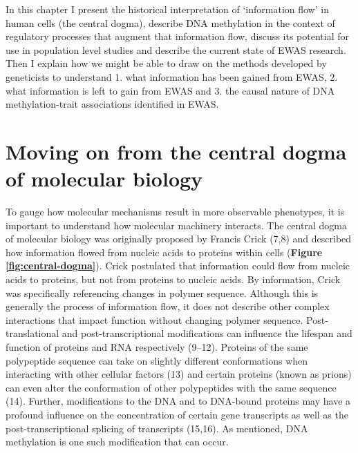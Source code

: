 \documentclass[11pt,oneside]{bristolthesis}
\begin{document}
In this chapter I present the historical interpretation of `information flow' in human cells (the central dogma), describe DNA methylation in the context of regulatory processes that augment that information flow, discuss its potential for use in population level studies and describe the current state of EWAS research. Then I explain how we might be able to draw on the methods developed by geneticists to understand 1. what information has been gained from EWAS, 2. what information is left to gain from EWAS and 3. the causal nature of DNA methylation-trait associations identified in EWAS.

\hypertarget{central-dogma}{%
\section{Moving on from the central dogma of molecular biology}\label{central-dogma}}

To gauge how molecular mechanisms result in more observable phenotypes, it is important to understand how molecular machinery interacts. The central dogma of molecular biology was originally proposed by Francis Crick (7,8) and described how information flowed from nucleic acids to proteins within cells (\textbf{Figure \ref{fig:central-dogma}}). Crick postulated that information could flow from nucleic acids to proteins, but not from proteins to nucleic acids. By information, Crick was specifically referencing changes in polymer sequence. Although this is generally the process of information flow, it does not describe other complex interactions that impact function without changing polymer sequence. Post-translational and post-transcriptional modifications can influence the lifespan and function of proteins and RNA respectively (9--12). Proteins of the same polypeptide sequence can take on slightly different conformations when interacting with other cellular factors (13) and certain proteins (known as prions) can even alter the conformation of other polypeptides with the same sequence (14). Further, modifications to the DNA and to DNA-bound proteins may have a profound influence on the concentration of certain gene transcripts as well as the post-transcriptional splicing of transcripts (15,16). As mentioned, DNA methylation is one such modification that can occur.
\end{document}
